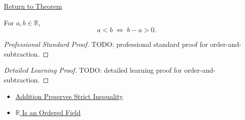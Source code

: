 \newpage
{}
\label{prf:order-and-subtraction}

\begin{remark*}[Return]
\hyperref[lem:order-and-subtraction]{Return to Theorem}
\end{remark*}

\begin{lemma*}
For $a,b\in\mathbb{R}$,
\[
a<b \;\Longleftrightarrow\; b-a>0.
\]
\end{lemma*}

\begin{proof}[Professional Standard Proof]
\LRAProofBodyStart
TODO: professional standard proof for order-and-subtraction.
\end{proof}

\begin{proof}[Detailed Learning Proof]
\LRAProofBodyStart
TODO: detailed learning proof for order-and-subtraction.
\end{proof}

\begin{remark*}
\end{remark*}

\begin{dependencies}
\begin{itemize}
  \item \hyperref[thm:ineq-add-both-sides]{Addition Preserves Strict Inequality}
  \item \hyperref[thm:r-is-an-ordered-field]{$\mathbb{R}$ Is an Ordered Field}
\end{itemize}
\end{dependencies}

\clearpage
